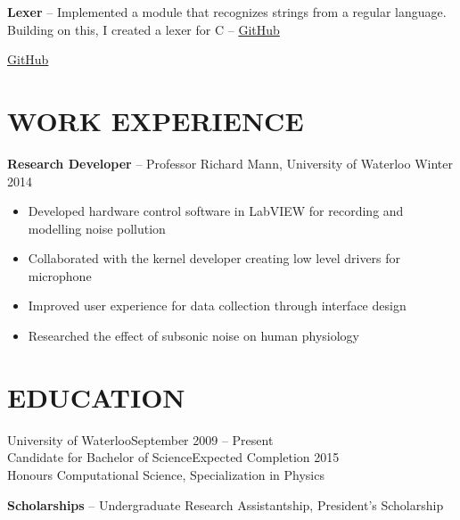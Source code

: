 \documentclass{res}
\begin{document}
\begin{resume}
    {\bf Lexer} -- Implemented a module that recognizes strings from a regular language.\\
    \hspace*{13mm}  Building on this, I created a lexer for C --
    \href{https://www.github.com/joelwilliamson/ndfa}{GitHub}

    \href{https://www.github.com/joelwilliamson/life}{GitHub} \\
    
    
 
\section{WORK EXPERIENCE}
  \vspace{3mm}
    {\bf Research Developer} -- Professor Richard Mann, University of Waterloo	\hfill Winter 2014\\
    \vspace{-2mm}
   \begin{itemize}
    \item Developed hardware control software in LabVIEW for recording and modelling noise pollution
    \item Collaborated with the kernel developer creating low level drivers for microphone
    \item Improved user experience for data collection through interface design
    \item Researched the effect of subsonic noise on human physiology
    
   \end{itemize}

   
\section{EDUCATION}          
  \vspace{3mm}
    University of Waterloo\hfill September 2009 -- Present\\
    Candidate for Bachelor of Science\hfill Expected Completion 2015\\
    Honours Computational Science, Specialization in Physics
    \vspace{-3mm}
    
    {\bf Scholarships} -- Undergraduate Research Assistantship, President's Scholarship
    \vspace{-3mm}
    

\end{resume}
\end{document}
